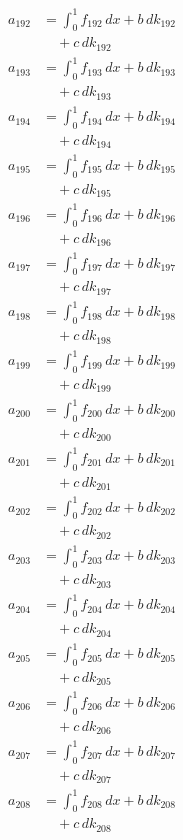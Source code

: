 \documentclass{article}
\begin{document}
\begin{align}
a_{192} &= \int_0^1 f_{192}\,dx + b\,dk_{192} \\
&\quad + c\,dk_{192} \\
a_{193} &= \int_0^1 f_{193}\,dx + b\,dk_{193} \\
&\quad + c\,dk_{193} \\
a_{194} &= \int_0^1 f_{194}\,dx + b\,dk_{194} \\
&\quad + c\,dk_{194} \\
a_{195} &= \int_0^1 f_{195}\,dx + b\,dk_{195} \\
&\quad + c\,dk_{195} \\
a_{196} &= \int_0^1 f_{196}\,dx + b\,dk_{196} \\
&\quad + c\,dk_{196} \\
a_{197} &= \int_0^1 f_{197}\,dx + b\,dk_{197} \\
&\quad + c\,dk_{197} \\
a_{198} &= \int_0^1 f_{198}\,dx + b\,dk_{198} \\
&\quad + c\,dk_{198} \\
a_{199} &= \int_0^1 f_{199}\,dx + b\,dk_{199} \\
&\quad + c\,dk_{199} \\
a_{200} &= \int_0^1 f_{200}\,dx + b\,dk_{200} \\
&\quad + c\,dk_{200} \\
a_{201} &= \int_0^1 f_{201}\,dx + b\,dk_{201} \\
&\quad + c\,dk_{201} \\
a_{202} &= \int_0^1 f_{202}\,dx + b\,dk_{202} \\
&\quad + c\,dk_{202} \\
a_{203} &= \int_0^1 f_{203}\,dx + b\,dk_{203} \\
&\quad + c\,dk_{203} \\
a_{204} &= \int_0^1 f_{204}\,dx + b\,dk_{204} \\
&\quad + c\,dk_{204} \\
a_{205} &= \int_0^1 f_{205}\,dx + b\,dk_{205} \\
&\quad + c\,dk_{205} \\
a_{206} &= \int_0^1 f_{206}\,dx + b\,dk_{206} \\
&\quad + c\,dk_{206} \\
a_{207} &= \int_0^1 f_{207}\,dx + b\,dk_{207} \\
&\quad + c\,dk_{207} \\
a_{208} &= \int_0^1 f_{208}\,dx + b\,dk_{208} \\
&\quad + c\,dk_{208} \\

\end{align}
\end{document}
